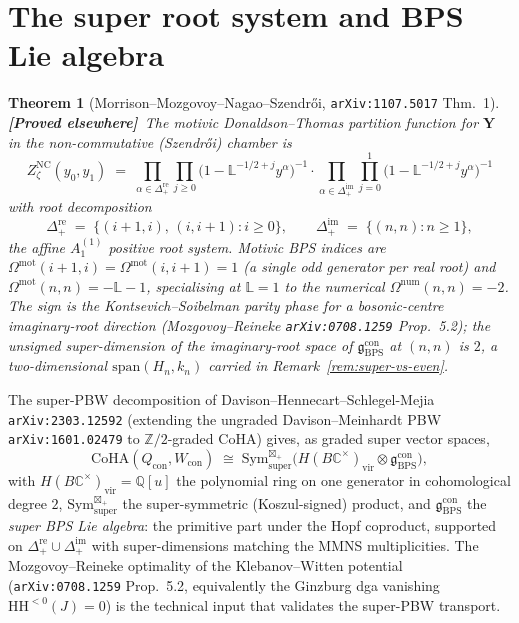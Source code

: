 \documentclass[11pt]{amsart}
\newtheorem{theorem}{Theorem}[section]
\theoremstyle{definition}
\providecommand{\CoHA}{\mathrm{CoHA}}
\providecommand{\bY}{\mathbf{Y}}
\providecommand{\bZ}{\mathbb{Z}}
\providecommand{\bC}{\mathbb{C}}
\providecommand{\bL}{\mathbb{L}}
\providecommand{\bQ}{\mathbb{Q}}
\providecommand{\fg}{\mathfrak{g}}
\providecommand{\ClaimStatusProvedElsewhere}{\textbf{\textsf{[Proved elsewhere]}}}
\begin{document}
\section{The super root system and BPS Lie algebra}

\begin{theorem}[Morrison--Mozgovoy--Nagao--Szendrői, \texttt{arXiv:1107.5017} Thm.~1]
\label{thm:mmns}
\ClaimStatusProvedElsewhere\
The motivic Donaldson--Thomas partition function for $\bY$ in the
non-commutative (Szendrői) chamber is
\[
  Z^{\mathrm{NC}}_\zeta(y_0, y_1) \;=\;
  \prod_{\alpha \in \Delta_+^{\mathrm{re}}}\!\prod_{j \geq 0}
    \bigl(1 - \bL^{-1/2+j} y^\alpha\bigr)^{-1}
  \cdot
  \prod_{\alpha \in \Delta_+^{\mathrm{im}}}\!\prod_{j=0}^{1}
    \bigl(1 - \bL^{-1/2+j} y^\alpha\bigr)^{-1}
\]
with root decomposition
\[
  \Delta_+^{\mathrm{re}} \;=\; \{(i+1,i),\,(i,i+1) : i \geq 0\},
  \qquad
  \Delta_+^{\mathrm{im}} \;=\; \{(n,n) : n \geq 1\},
\]
the affine $A_1^{(1)}$ positive root system. Motivic BPS indices are
$\Omega^{\mathrm{mot}}(i+1,i) = \Omega^{\mathrm{mot}}(i,i+1) = 1$ (a
single odd generator per real root) and
$\Omega^{\mathrm{mot}}(n,n) = -\bL - 1$, specialising at $\bL = 1$ to
the numerical $\Omega^{\mathrm{num}}(n,n) = -2$. The sign is the
Kontsevich--Soibelman parity phase for a bosonic-centre imaginary-root
direction (Mozgovoy--Reineke \texttt{arXiv:0708.1259} Prop.~5.2); the
\emph{unsigned} super-dimension of the imaginary-root space of
$\fg_{\mathrm{BPS}}^{\mathrm{con}}$ at $(n,n)$ is $2$, a two-dimensional
$\mathrm{span}(H_n, k_n)$ carried in Remark~\ref{rem:super-vs-even}.
\end{theorem}

The super-PBW decomposition of Davison--Hennecart--Schlegel-Mejia
\texttt{arXiv:2303.12592} (extending the ungraded Davison--Meinhardt PBW
\texttt{arXiv:1601.02479} to $\bZ/2$-graded CoHA) gives, as graded super
vector spaces,
\[
  \CoHA(Q_{\mathrm{con}}, W_{\mathrm{con}})
  \;\cong\;
  \mathrm{Sym}^{\boxtimes_+}_{\mathrm{super}}\!\bigl(H(B\bC^\times)_{\mathrm{vir}} \otimes \fg_{\mathrm{BPS}}^{\mathrm{con}}\bigr),
\]
with $H(B\bC^\times)_{\mathrm{vir}} = \bQ[u]$ the polynomial ring on one
generator in cohomological degree $2$, $\mathrm{Sym}^{\boxtimes_+}_{\mathrm{super}}$
the super-symmetric (Koszul-signed) product, and $\fg_{\mathrm{BPS}}^{\mathrm{con}}$
the \emph{super BPS Lie algebra}: the primitive part under the Hopf
coproduct, supported on $\Delta_+^{\mathrm{re}} \cup \Delta_+^{\mathrm{im}}$
with super-dimensions matching the MMNS multiplicities. The Mozgovoy--Reineke
optimality of the Klebanov--Witten potential (\texttt{arXiv:0708.1259}
Prop.~5.2, equivalently the Ginzburg dga vanishing $\mathrm{HH}^{<0}(J) = 0$)
is the technical input that validates the super-PBW transport.
\end{document}
